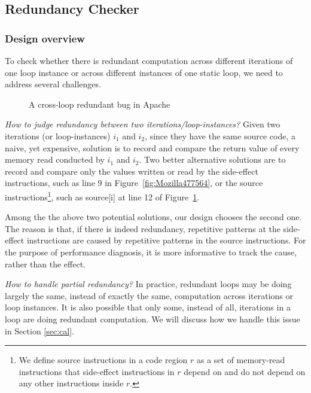 \subsection{Redundancy Checker}
\label{sec:redundant}

\subsubsection{Design overview}
To check whether there is redundant computation across different iterations
of one loop instance or across different instances of one static loop, we need
to address several challenges.

\begin{figure}
\caption{A cross-loop redundant bug in Apache}
\label{fig:Apache34464}
\end{figure}




\emph{How to judge redundancy between two iterations/loop-instances?}
Given two iterations (or loop-instances) $i_1$ and $i_2$, since they have 
the same source code, 
a naive, yet expensive, solution is to record and compare the return value of
every memory read conducted by $i_1$ and $i_2$. Two better alternative
solutions are to record and compare only the values written or read by the
side-effect instructions, such as 
line 9 in Figure~\ref{fig:Mozilla477564},
or the source instructions\footnote{We define source instructions in a code
region $r$ as a set of memory-read instructions that side-effect
instructions in $r$ depend on and do not depend on any other instructions
inside $r$.}, 
such as source[i] at line 12 of Figure~\ref{fig:Apache34464}.

Among the the above two potential solutions, our design chooses the second one.
The reason is that, if there is indeed
redundancy, repetitive patterns at the side-effect instructions are caused by
repetitive patterns in the source instructions.
For the purpose of performance diagnosis, it is
more informative to track the cause, rather than the effect.

\emph{How to handle partial redundancy?}
In practice, redundant loops may be doing largely the same, instead of exactly
the same, computation across iterations or loop instances. It is also possible
that only some, instead of all, iterations in a loop are doing redundant
computation. We will discuss how we handle this issue in Section \ref{sec:cal}.



